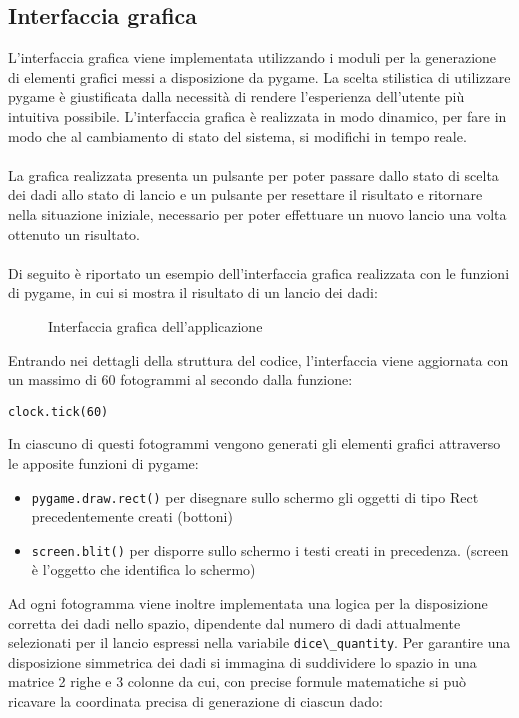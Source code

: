 \subsection{Interfaccia grafica}
L'interfaccia grafica viene implementata utilizzando i moduli per la generazione di elementi grafici messi a disposizione da pygame.
La scelta stilistica di utilizzare pygame è giustificata dalla necessità di rendere l'esperienza dell'utente più intuitiva possibile.
L'interfaccia grafica è realizzata in modo dinamico, per fare in modo che al cambiamento di stato del sistema, si modifichi in tempo reale.
\\\\La grafica realizzata presenta un pulsante per poter passare dallo stato di scelta dei dadi allo stato di lancio e un pulsante per resettare il risultato
e ritornare nella situazione iniziale, necessario per poter effettuare un nuovo lancio una volta ottenuto un risultato.
\\\\Di seguito è riportato un esempio dell'interfaccia grafica realizzata con le funzioni di pygame, in cui si mostra il risultato di un lancio dei dadi:
\begin{figure}[H]
    \centering
    \caption{Interfaccia grafica dell'applicazione}
    \label{fig:RollStateON3}
\end{figure}
Entrando nei dettagli della struttura del codice, l'interfaccia viene aggiornata con un massimo di 60 fotogrammi al secondo dalla funzione:
\begin{verbatim}
clock.tick(60)
\end{verbatim}
In ciascuno di questi fotogrammi vengono generati gli elementi grafici attraverso le apposite funzioni di pygame:
\begin{itemize}
    \item \Verb#pygame.draw.rect()# per disegnare sullo schermo gli oggetti di tipo Rect precedentemente creati (bottoni)
    \item \Verb#screen.blit()# per disporre sullo schermo i testi creati in precedenza. (screen è l'oggetto che identifica lo schermo)
\end{itemize}
Ad ogni fotogramma viene inoltre implementata una logica per la disposizione corretta dei dadi nello spazio, dipendente dal numero di dadi attualmente
selezionati per il lancio espressi nella variabile \Verb|dice\_quantity|. Per garantire una disposizione simmetrica dei dadi si immagina di
suddividere lo spazio in una matrice 2 righe e 3 colonne da cui, con precise formule matematiche si può ricavare la coordinata precisa di generazione di ciascun dado:
